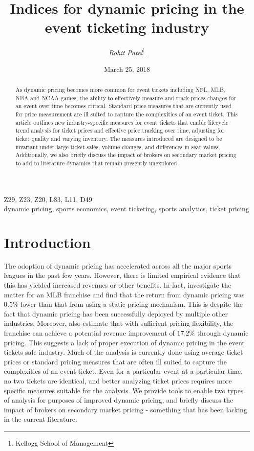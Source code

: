 \documentclass[letterpaper, 12pt]{article}
\begin{document}
\title{Indices for dynamic pricing in the event ticketing industry}
\author{\emph{Rohit Patel}\thanks{Kellogg School of Management}}
\date {March 25, 2018}
\maketitle
\begin{abstract} As dynamic pricing becomes more common for event tickets including NFL, MLB, NBA and NCAA games, the ability to effectively measure and track prices changes for an event over time becomes critical. Standard price measures that are currently used for price measurement are ill suited to capture the complexities of an event ticket. This article outlines new industry-specific measures for event tickets that enable lifecycle trend analysis for ticket prices and effective price tracking over time, adjusting for ticket quality and varying inventory. The measures introduced are designed to be invariant under large ticket sales, volume changes, and differences in seat values. Additionally, we also briefly discuss the impact of brokers on secondary market pricing to add to literature dynamics that remain presently unexplored
\end{abstract}
 Z29, Z23, Z20, L83, L11, D49 \\
 dynamic pricing, sports economics, event ticketing, sports analytics, ticket pricing

\section{Introduction}
The adoption of dynamic pricing has accelerated across all the major sports leagues in the past few years. However, there is limited empirical evidence that this has yielded increased revenues or other benefits.  In-fact, \cite{xu2017designing} investigate the matter for an MLB franchise and find that the return from dynamic pricing was $0.5\%$ lower than that from using a static pricing mechanism. This is despite the fact that dynamic pricing has been successfully deployed by multiple other industries. Moreover, \cite{xu2017designing} also estimate that with sufficient pricing flexibility, the franchise can achieve a potential revenue improvement of $17.2\%$ through dynamic pricing. This suggests a lack of proper execution of dynamic pricing in the event tickets sale industry. Much of the analysis is currently done using average ticket prices or standard pricing measures that are often ill suited to capture the complexities of an event ticket. Even for a particular event at a particular time, no two tickets are identical, and better analyzing ticket prices requires more specific measures suitable for the analysis. We provide tools to enable two types of analysis for purposes of improved dynamic pricing, and briefly discuss the impact of brokers on secondary market pricing - something that has been lacking in the current literature.
\end{document}
